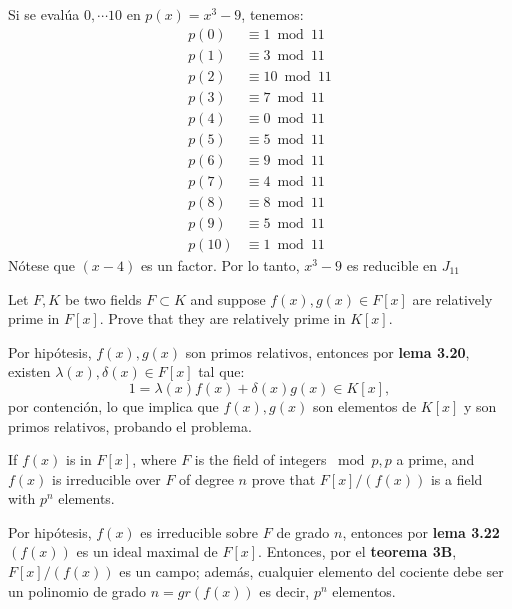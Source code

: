 \begin{problema}[Problema 2]
\begin{enumerate}
\begin{dem}
            Si se evalúa $0,\cdots 10$ en $p(x)=x^3-9$, tenemos: 
            \begin{align*}
                p(0) &\equiv 1\bmod 11\\
                p(1) &\equiv 3\bmod 11\\
                p(2) &\equiv 10\bmod 11\\
                p(3) &\equiv 7\bmod 11\\
                p(4) &\equiv 0\bmod 11\\
                p(5) &\equiv 5\bmod 11\\
                p(6) &\equiv 9\bmod 11\\
                p(7) &\equiv 4\bmod 11\\
                p(8) &\equiv 8\bmod 11\\
                p(9) &\equiv 5\bmod 11\\
                p(10) &\equiv 1\bmod 11
            \end{align*}
            Nótese que $(x-4)$ es un factor. Por lo tanto, $x^3-9$ es reducible en $J_{11}$
                \end{dem}
    \end{enumerate}


\end{problema}
\begin{problema}[Problema 3]
    Let $F, K$ be two fields $F \subset K$ and suppose $f(x), g(x) \in F[x]$ are relatively prime in $F[x]$. Prove that they are relatively prime in $K[x]$.
    \begin{dem}
        Por hipótesis, $f(x),g(x)$ son primos relativos, entonces por \textbf{lema 3.20}, existen $\lambda(x),\delta(x)\in F[x]$ tal que: 
        $$1= \lambda(x)f(x)+\delta(x)g(x)\in K[x],$$
        por contención, lo que implica que $f(x),g(x)$ son elementos de $K[x]$ y son primos relativos, probando el problema.
    \end{dem}
\end{problema}
\begin{problema}[Problema 7]
    If $f(x)$ is in $F[x]$, where $F$ is the field of integers $\bmod p, p$ a prime, and $f(x)$ is irreducible over $F$ of degree $n$ prove that $F[x] /(f(x))$ is a field with $p^n$ elements.
    \begin{dem}
        Por hipótesis, $f(x)$ es irreducible sobre $F$ de grado $n$, entonces por \textbf{lema 3.22} $(f(x))$ es un ideal maximal de $F[x]$. Entonces, por el \textbf{teorema 3B}, $F[x]/(f(x))$ es un campo; además, cualquier elemento del cociente debe ser un polinomio de grado $n=gr(f(x))$ es decir, $p^n$ elementos. 
    \end{dem}
\end{problema}

%
%

